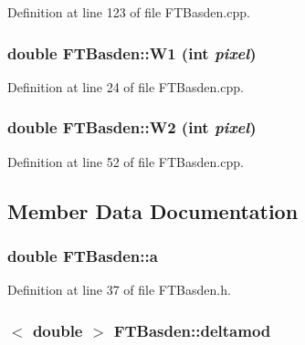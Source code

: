 Definition at line 123 of file FTBasden.cpp.

\hypertarget{classFTBasden_a8d1e981f8af57e71a569f026b8ab9980}{
\subsubsection[{W1}]{\setlength{\rightskip}{0pt plus 5cm}double FTBasden::W1 (int {\em pixel})}}
\label{classFTBasden_a8d1e981f8af57e71a569f026b8ab9980}


Definition at line 24 of file FTBasden.cpp.

\hypertarget{classFTBasden_abe46b656653caaabd727215148634ff8}{
\subsubsection[{W2}]{\setlength{\rightskip}{0pt plus 5cm}double FTBasden::W2 (int {\em pixel})}}
\label{classFTBasden_abe46b656653caaabd727215148634ff8}


Definition at line 52 of file FTBasden.cpp.



\subsection{Member Data Documentation}
\hypertarget{classFTBasden_a991d9edce4679a24a08b23de51e070cb}{
\subsubsection[{a}]{\setlength{\rightskip}{0pt plus 5cm}double {\bf FTBasden::a}}}
\label{classFTBasden_a991d9edce4679a24a08b23de51e070cb}


Definition at line 37 of file FTBasden.h.

\hypertarget{classFTBasden_a8613c1a7437bdd9f42b8bd4565a3c625}{
\subsubsection[{deltamod}]{$<$ double $>$ {\bf FTBasden::deltamod}}}
\label{classFTBasden_a8613c1a7437bdd9f42b8bd4565a3c625}



